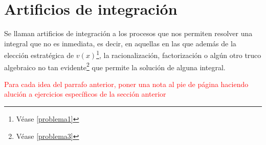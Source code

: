 \section{Artificios de integración}\label{sec4}
Se llaman artificios de integración a los procesos que nos permiten resolver una integral que no es inmediata, es decir, en aquellas en las que además de la elección estratégica de $v(x)$\footnote{Véase \cref{problema1}}, la racionalización, factorización o algún otro truco algebraico no tan evidente\footnote{Véase \cref{problema3}} que permite la solución de alguna integral.

\textcolor{red}{Para cada idea del parrafo anterior, poner una nota al pie de página haciendo alución a ejercicios específicos de la sección anterior}











